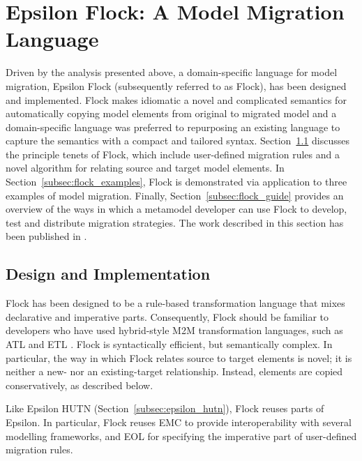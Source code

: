 
\section{Epsilon Flock: A Model Migration Language}
\label{sec:flock}
Driven by the analysis presented above, a domain-specific language for model migration, Epsilon Flock (subsequently referred to as Flock), has been designed and implemented. Flock makes idiomatic a novel and complicated semantics for automatically copying model elements from original to migrated model and a domain-specific language was preferred to repurposing an existing language to capture the semantics with a compact and tailored syntax. Section~\ref{subsec:flock_design} discusses the principle tenets of Flock, which include user-defined migration rules and a novel algorithm for relating source and target model elements. In Section~\ref{subsec:flock_examples}, Flock is demonstrated via application to three examples of model migration. Finally, Section~\ref{subsec:flock_guide} provides an overview of the ways in which a metamodel developer can use Flock to develop, test and distribute migration strategies. The work described in this section has been published in \cite{rose10flock}.

\subsection{Design and Implementation}
\label{subsec:flock_design}
Flock has been designed to be a rule-based transformation language that mixes declarative and imperative parts. Consequently, Flock should be familiar to developers who have used hybrid-style M2M transformation languages, such as ATL and ETL \cite{kolovos08etl}. Flock is syntactically efficient, but semantically complex. In particular, the way in which Flock relates source to target elements is novel; it is neither a new- nor an existing-target relationship. Instead, elements are copied conservatively, as described below.

Like Epsilon HUTN (Section~\ref{subsec:epsilon_hutn}), Flock reuses parts of Epsilon. In particular, Flock reuses EMC to provide interoperability with several modelling frameworks, and EOL for specifying the imperative part of user-defined migration rules.

